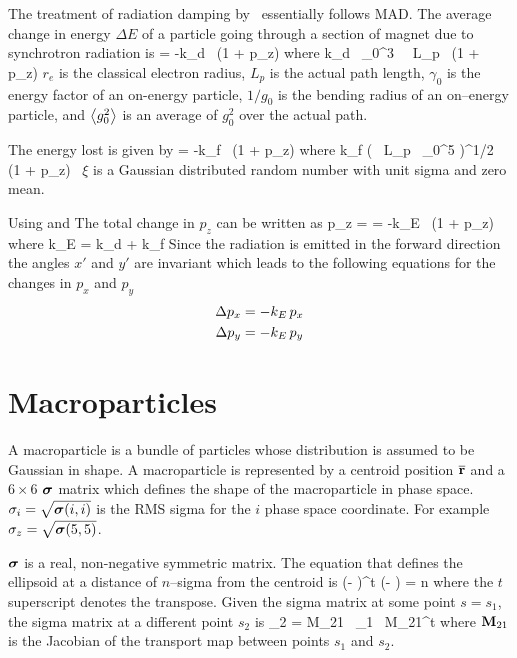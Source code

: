 The treatment of radiation damping by \bmad\ essentially follows MAD.
The average change in energy $\Delta E$ of a particle going through a
section of magnet due to synchrotron radiation is
\Begineq
   = -k_d \, (1 + p_z)
\Endeq
where
\Begineq
  k_d \equiv {} \, \gamma_0^3 \,  \, L_p \,  
  (1 + p_z)
  \label{k2r3g}
\Endeq
$r_e$ is the classical electron radius, $L_p$ is the actual path
length, $\gamma_0$ is the energy factor of an on-energy particle, $1/g_0$
is the bending radius of an on--energy particle, and $\left\langle g_0^2 \right\rangle$ is an
average of $g_0^2$ over the actual path.

The energy lost is given by
\Begineq
   = -k_f \, (1 + p_z)
\Endeq
where
\Begineq
  k_f \equiv \left(  \, 
  L_p \, \gamma_0^5  \right)^{1/2} \, (1 + p_z) \, \xi
  \label{k55rh}
\Endeq
$\xi$ is a Gaussian distributed random number with unit sigma and zero mean.

Using  and  The total change in $p_z$ can be written as
\Begineq
  \Delta p_z =  = -k_E \, (1 + p_z)
\Endeq
where
\Begineq
  k_E = k_d + k_f
\Endeq
Since the radiation is emitted in the forward direction the angles
$x'$ and $y'$ are invariant which leads to the following equations for
the changes in $p_x$ and $p_y$
\begin{align}
  \Delta p_x &= -k_E \, p_x \nonumber \\
  \Delta p_y &= -k_E \, p_y 
\end{align}

\section{Macroparticles}
\label{s:macro}

A macroparticle\cite{b:transport_appendix} is a bundle of particles
whose distribution is assumed to be Gaussian in shape. A macroparticle
is represented by a centroid position $\overline{{\bf r}}$ and a $6 \times 6$
$\boldsymbol{\sigma}$ matrix which defines the shape of the macroparticle in
phase space. $\sigma_i = \sqrt{\boldsymbol{\sigma}(i,i)}$ is the RMS sigma for the $i$\Th
phase space coordinate. For example $\sigma_z = \sqrt{\boldsymbol{\sigma}(5,5)}$.

$\boldsymbol{\sigma}$ is a real, non-negative symmetric matrix. The equation that
defines the ellipsoid at a distance of $n$--sigma from the centroid is
\Begineq
  (\bfr - \bfrbar)^t \bfsigma\inv (\bfr - \bfrbar) = n
\Endeq
where the $t$ superscript denotes the transpose. Given the sigma matrix
at some point $s = s_1$, the sigma matrix at a different point $s_2$ is
\Begineq
  \bfsigma_2 = \Bf M_{21} \, \bfsigma_1 \, \Bf M_{21}^t
\Endeq
where ${\bf M}_{21}$ is the Jacobian of the transport map between points
$s_1$ and $s_2$.

